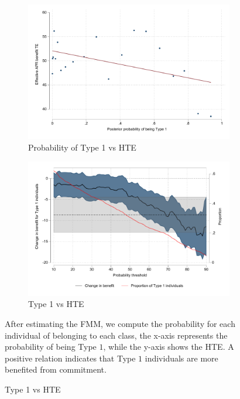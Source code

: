 \begin{figure}[H]
    \caption{Treatment effect of Type 1 individuals}
    \label{fmm_hte}
    \begin{center}
    \begin{subfigure}{0.475\textwidth}       
            \caption{Probability of Type 1 vs HTE}
            \centering
        \includegraphics[width=\textwidth]{Figuras/binscatter_tau_classpost.pdf}
    \end{subfigure}
   \begin{subfigure}{0.475\textwidth}
        \caption{Type 1 vs HTE}
        \centering
        \includegraphics[width=\textwidth]{Figuras/benefit_type1p.pdf}
    \end{subfigure}
    \end{center}
     \scriptsize 
     After estimating the FMM, we compute the probability for each individual of belonging to each class, the x-axis represents the probability of being Type $1$, while the y-axis shows the HTE. A positive relation indicates that Type $1$ individuals are more benefited from commitment.
\end{figure}

